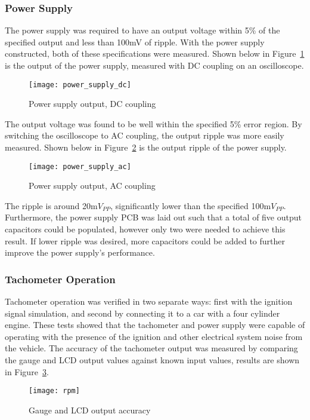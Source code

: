 \subsubsection{Power Supply}
The power supply was required to have an output voltage within 5\% of the specified output and less than 100mV of ripple. With the power supply constructed, both of these specifications were measured. Shown below in Figure~\ref{fig:ps_dc} is the output of the power supply, measured with DC coupling on an oscilloscope.

\begin{figure}[H]
    \centering
    \texttt{[image: power\_supply\_dc]}
    \caption{Power supply output, DC coupling}
    \label{fig:ps_dc}
\end{figure}

The output voltage was found to be well within the specified 5\% error region. By switching the oscilloscope to AC coupling, the output ripple was more easily measured. Shown below in Figure~\ref{fig:ps_ac} is the output ripple of the power supply.

\begin{figure}[H]
    \centering
    \texttt{[image: power\_supply\_ac]}
    \caption{Power supply output, AC coupling}
    \label{fig:ps_ac}
\end{figure}

The ripple is around 20m$V_{PP}$, significantly lower than the specified 100m$V_{PP}$. Furthermore, the power supply PCB was laid out such that a total of five output capacitors could be populated, however only two were needed to achieve this result. If lower ripple was desired, more capacitors could be added to further improve the power supply's performance.

\subsubsection{Tachometer Operation}
Tachometer operation was verified in two separate ways: first with the ignition signal simulation, and second by connecting it to a car with a four cylinder engine. These tests showed that the tachometer and power supply were capable of operating with the presence of the ignition and other electrical system noise from the vehicle. The accuracy of the tachometer output was measured by comparing the gauge and LCD output values against known input values, results are shown in Figure~\ref{fig:rpm}.

\begin{figure}[H]
    \centering
    \texttt{[image: rpm]}
    \caption{Gauge and LCD output accuracy}
    \label{fig:rpm}
\end{figure}


